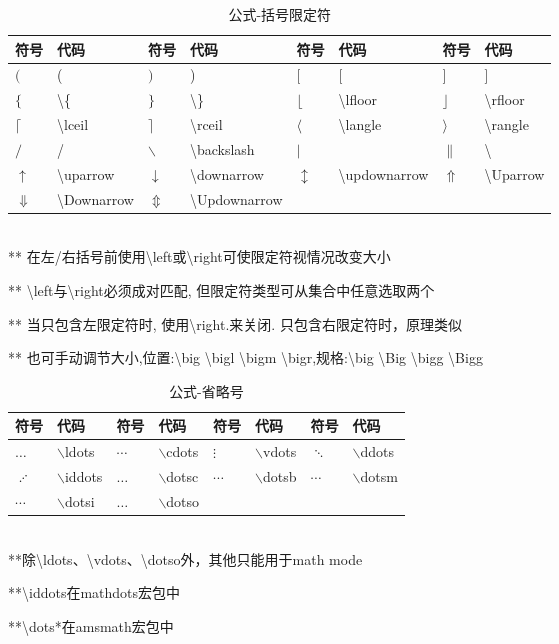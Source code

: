 \documentclass[UTF8,fontset=ubuntu]{ctexart}
\begin{document}
\begin{table}[H]
\begin{tabular}{l l l l l l l l}
	\hline
	符号 & 代码 & 符号 & 代码 & 符号 & 代码 & 符号 & 代码\\
	\hline
	$($ & ( & $)$ & ) & $[$ & [ & $]$ & ]\\
	$\{$ & \textbackslash \{ & $\}$ & \textbackslash \} & $\lfloor$ & \textbackslash lfloor & $\rfloor$ & \textbackslash rfloor\\
	$\lceil$ & \textbackslash lceil & $\rceil$ & \textbackslash rceil & $\langle$ & \textbackslash langle & $\rangle$ & \textbackslash rangle\\
	$/$ & / & $\backslash$ & \textbackslash backslash & $|$ & \textbar & $\|$ & \textbackslash\textbar\\
	$\uparrow$ & \textbackslash uparrow & $\downarrow$ & \textbackslash downarrow & $\updownarrow$ & \textbackslash updownarrow & $\Uparrow$ & \textbackslash Uparrow\\
	$\Downarrow$ & \textbackslash Downarrow & $\Updownarrow$ & \textbackslash Updownarrow\\
	\hline
\end{tabular}\\[2mm]
** 在左/右括号前使用\textbackslash left或\textbackslash right可使限定符视情况改变大小\par
** \textbackslash left与\textbackslash right必须成对匹配, 但限定符类型可从集合中任意选取两个\par
** 当只包含左限定符时, 使用\textbackslash right.来关闭. 只包含右限定符时，原理类似\par
** 也可手动调节大小,位置:\textbackslash big \textbackslash bigl \textbackslash bigm \textbackslash bigr,规格:\textbackslash big \textbackslash Big \textbackslash bigg \textbackslash Bigg
\caption{公式-括号限定符}
\end{table}

\begin{table}[H]
\begin{tabular}{l l l l l l l l}
	\hline
	符号 & 代码 & 符号 & 代码 & 符号 & 代码 & 符号 & 代码\\
	\hline
	$\ldots$ & $\backslash$ldots & $\cdots$ & $\backslash$cdots & $\vdots$ & $\backslash$vdots & $\ddots$ & $\backslash$ddots\\
	$\iddots$ & $\backslash$iddots & $\dotsc$ & $\backslash$dotsc & $\dotsb$ & $\backslash$dotsb & $\dotsm$ & $\backslash$dotsm\\
	$\dotsi$ & $\backslash$dotsi & $\dotso$ & $\backslash$dotso\\
	\hline
\end{tabular}\\[2mm]
\RaggedRight
**除\textbackslash ldots、\textbackslash vdots、\textbackslash dotso外，其他只能用于math mode\par
**\textbackslash iddots在mathdots宏包中\par
**\textbackslash dots*在amsmath宏包中
\caption{公式-省略号}
\end{table}
\end{document}
